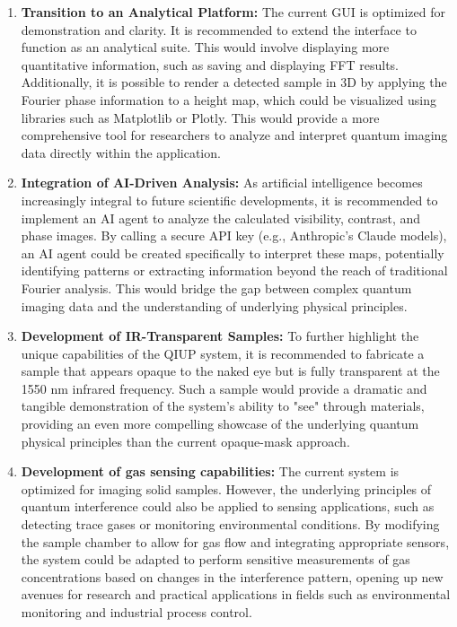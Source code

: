 \documentclass[12pt,a4paper]{article}
\begin{document}
\begin{enumerate}
    \item \textbf{Transition to an Analytical Platform:} The current \ac{GUI} is optimized for demonstration and clarity. It is recommended to extend the interface to function as an analytical suite. This would involve displaying more quantitative information, such as saving and displaying \ac{FFT} results. Additionally, it is possible to render a detected sample in 3D by applying the Fourier phase information to a height map, which could be visualized using libraries such as Matplotlib or Plotly. This would provide a more comprehensive tool for researchers to analyze and interpret quantum imaging data directly within the application.
    
    \item \textbf{Integration of AI-Driven Analysis:} As artificial intelligence becomes increasingly integral to future scientific developments, it is recommended to implement an AI agent to analyze the calculated visibility, contrast, and phase images. By calling a secure API key (e.g., Anthropic’s Claude models), an AI agent could be created specifically to interpret these maps, potentially identifying patterns or extracting information beyond the reach of traditional Fourier analysis. This would bridge the gap between complex quantum imaging data and the understanding of underlying physical principles.
    
    \item \textbf{Development of IR-Transparent Samples:} To further highlight the unique capabilities of the \ac{QIUP} system, it is recommended to fabricate a sample that appears opaque to the naked eye but is fully transparent at the 1550 nm infrared frequency. Such a sample would provide a dramatic and tangible demonstration of the system’s ability to "see" through materials, providing an even more compelling showcase of the underlying quantum physical principles than the current opaque-mask approach.

    \item \textbf{Development of gas sensing capabilities:} The current system is optimized for imaging solid samples. However, the underlying principles of quantum interference could also be applied to sensing applications, such as detecting trace gases or monitoring environmental conditions. By modifying the sample chamber to allow for gas flow and integrating appropriate sensors, the system could be adapted to perform sensitive measurements of gas concentrations based on changes in the interference pattern, opening up new avenues for research and practical applications in fields such as environmental monitoring and industrial process control.
\end{enumerate}
\end{document}
